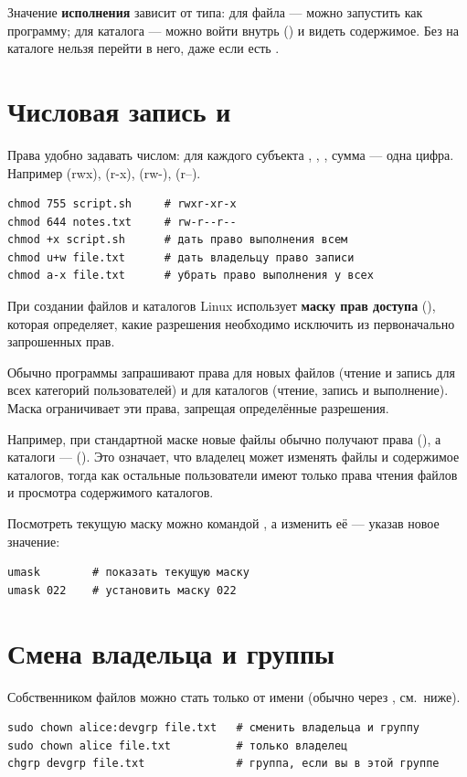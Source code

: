 Значение \textbf{исполнения} зависит от типа:
для файла --- можно запустить как программу; для каталога ---
можно войти внутрь () и видеть содержимое.
Без  на каталоге нельзя перейти в него, даже если есть .

\section{Числовая запись и }

Права удобно задавать числом: для каждого субъекта
, , , сумма --- одна цифра.
Например  (rwx),  (r-x),  (rw-),  (r--).
\begin{verbatim}
chmod 755 script.sh     # rwxr-xr-x
chmod 644 notes.txt     # rw-r--r--
chmod +x script.sh      # дать право выполнения всем
chmod u+w file.txt      # дать владельцу право записи
chmod a-x file.txt      # убрать право выполнения у всех
\end{verbatim}

При создании файлов и каталогов Linux использует
\textbf{маску прав доступа} (), которая определяет,
какие разрешения необходимо исключить из первоначально
запрошенных прав.

Обычно программы запрашивают права  для новых файлов
(чтение и запись для всех категорий пользователей)
и  для каталогов (чтение, запись и выполнение).
Маска  ограничивает эти права, запрещая
определённые разрешения.

Например, при стандартной маске  новые файлы
обычно получают права  (),
а каталоги ---  ().
Это означает, что владелец может изменять файлы
и содержимое каталогов, тогда как остальные пользователи
имеют только права чтения файлов и просмотра содержимого
каталогов.

Посмотреть текущую маску можно командой ,
а изменить её --- указав новое значение:

\begin{verbatim}
umask        # показать текущую маску
umask 022    # установить маску 022
\end{verbatim}

\section{Смена владельца и группы}

Собственником файлов можно стать только от имени 
(обычно через , см.\ ниже).
\begin{verbatim}
sudo chown alice:devgrp file.txt   # сменить владельца и группу
sudo chown alice file.txt          # только владелец
chgrp devgrp file.txt              # группа, если вы в этой группе
\end{verbatim}

